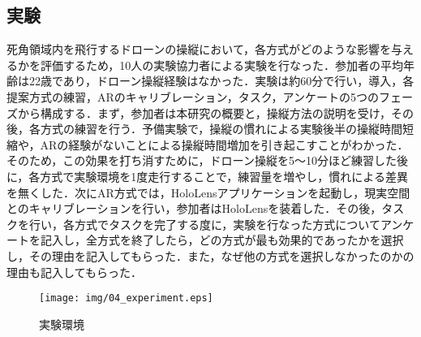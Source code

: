 \documentclass[submit]{ipsj}
\begin{document}
\subsection{実験}
死角領域内を飛行するドローンの操縦において，各方式がどのような影響を与えるかを評価するため，10人の実験協力者による実験を行なった．参加者の平均年齢は22歳であり，ドローン操縦経験はなかった．実験は約60分で行い，導入，各提案方式の練習，ARのキャリブレーション，タスク，アンケートの5つのフェーズから構成する．まず，参加者は本研究の概要と，操縦方法の説明を受け，その後，各方式の練習を行う．予備実験で，操縦の慣れによる実験後半の操縦時間短縮や，ARの経験がないことによる操縦時間増加を引き起こすことがわかった．そのため，この効果を打ち消すために，ドローン操縦を5〜10分ほど練習した後に，各方式で実験環境を1度走行することで，練習量を増やし，慣れによる差異を無くした．次にAR方式では，HoloLensアプリケーションを起動し，現実空間とのキャリブレーションを行い，参加者はHoloLensを装着した．その後，タスクを行い，各方式でタスクを完了する度に，実験を行なった方式についてアンケートを記入し，全方式を終了したら，どの方式が最も効果的であったかを選択し，その理由を記入してもらった．また，なぜ他の方式を選択しなかったのかの理由も記入してもらった．

\begin{figure}[tb]
\centering
\texttt{[image: img/04\_experiment.eps]}
\caption{実験環境}
\label{fig:04_experiment}
\end{figure}


\end{document}
